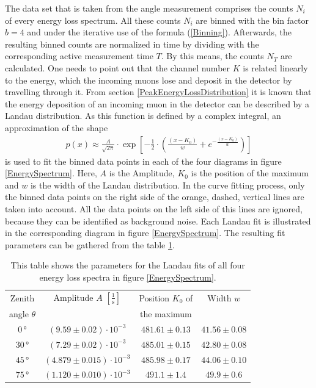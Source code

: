 \noindent The data set that is taken from the angle measurement comprises the counts $N_i$ of every energy loss spectrum.
All these counts $N_i$ are binned with the bin factor $b=4$ and under the iterative use of the formula (\ref{Binning}).
Afterwards, the resulting binned counts are normalized in time by dividing with the corresponding active measurement time $T$.
By this means, the counts $N_T$ are calculated.
One needs to point out that the channel number $K$ is related linearly to the energy, which the incoming muons lose and deposit in the detector by travelling through it.
From section \ref{PeakEnergyLossDistribution} it is known that the energy deposition of an incoming muon in the detector can be described by a Landau distribution.
As this function is defined by a complex integral, an approximation of the shape
\begin{align} \label{LandauDistribution}
p(x)\approx\frac{A}{\sqrt{2\pi}}\cdot\exp\left[-\frac{1}{2}\cdot\left(\frac{\left(x-K_0\right)}{w}+e^{-\frac{(x-K_0)}{w}}\right)\right]
\end{align}
\noindent is used to fit the binned data points in each of the four diagrams in figure \ref{EnergySpectrum}.
Here, $A$ is the Amplitude, $K_0$ is the position of the maximum and $w$ is the width of the Landau distribution.
In the curve fitting process, only the binned data points on the right side of the orange, dashed, vertical lines are taken into account.
All the data points on the left side of this lines are ignored, because they can be identified as background noise.
Each Landau fit is illustrated in the corresponding diagram in figure \ref{EnergySpectrum}.
The resulting fit parameters can be gathered from the table \ref{LandauFitParameters}.
\begin{table}[H]
	\centering
	\caption{This table shows the parameters for the Landau fits of all four energy loss spectra in figure \ref{EnergySpectrum}.}
	\begin{tabular}{|c|c|c|c|}
		Zenith & Amplitude $A$ $\left[\frac{1}{\text{s}}\right] $ & Position $K_0$ of & Width $w$ \\
		angle $\theta$ &  & the maximum &  \\
		\hline
		$0\,$° & $(9.59\pm 0.02)\cdot 10^{-3}$ & $481.61\pm 0.13$ & $41.56\pm 0.08$ \\
		\hline
		$30\,$° & $(7.29\pm 0.02)\cdot 10^{-3}$ & $485.01\pm 0.15$ & $42.80\pm 0.08$ \\
		\hline
		$45\,$° & $(4.879\pm 0.015)\cdot 10^{-3}$ & $485.98\pm 0.17$ & $44.06\pm 0.10$ \\
		\hline
		$75\,$° & $(1.120\pm 0.010)\cdot 10^{-3}$ & $491.1\pm 1.4$ & $49.9\pm 0.6$ \\
	\end{tabular}
	\label{LandauFitParameters}
\end{table}

